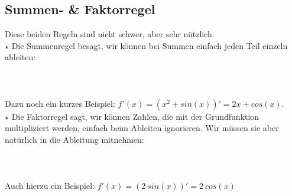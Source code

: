 \subsection{Summen- \& Faktorregel}
	Diese beiden Regeln sind nicht schwer, aber sehr nützlich.\\

	\(\star\) Die Summenregel besagt, wir können bei Summen einfach jeden Teil
	einzeln ableiten:
	\\ \\
	\formel{\[(f(x)+g(x))'=f'(x)+g'(x)\]}
	\\ \\
	Dazu noch ein kurzes Beispiel: \(f'(x)=(x^2+sin(x))'=2x+cos(x)\).\\

	\(\star\) Die Faktorregel sagt, wir können Zahlen, die
	mit der Grundfunktion multipliziert werden, einfach beim Ableiten ignorieren.
	Wir müssen sie aber natürlich in die Ableitung mitnehmen:
	\\ \\
	\formel{\[f'(x)=(a\cdot g(x))'=a\cdot g'(x)\]}
	\\ \\
	Auch hierzu ein Beispiel: \(f'(x)=(2\ sin(x))'=2\ cos(x)\)
